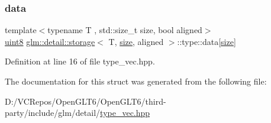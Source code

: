 \subsubsection{\texorpdfstring{data}{data}}
{\footnotesize\ttfamily template$<$typename T , std\+::size\+\_\+t size, bool aligned$>$ \\
\mbox{\hyperlink{namespaceglm_1_1detail_aef2588f97d090cc19fbbe0c74fe17c8f}{uint8}} \mbox{\hyperlink{structglm_1_1detail_1_1storage}{glm\+::detail\+::storage}}$<$ T, \mbox{\hyperlink{glad_8h_a79ef9eb3e59c4bb34c4b9fbeb8d28ff7}{size}}, aligned $>$\+::type\+::data\mbox{[}\mbox{\hyperlink{glad_8h_a79ef9eb3e59c4bb34c4b9fbeb8d28ff7}{size}}\mbox{]}}



Definition at line 16 of file type\+\_\+vec.\+hpp.



The documentation for this struct was generated from the following file\+:\begin{DoxyCompactItemize}
\item 
D\+:/\+V\+C\+Repos/\+Open\+G\+L\+T6/\+Open\+G\+L\+T6/third-\/party/include/glm/detail/\mbox{\hyperlink{type__vec_8hpp}{type\+\_\+vec.\+hpp}}\end{DoxyCompactItemize}
